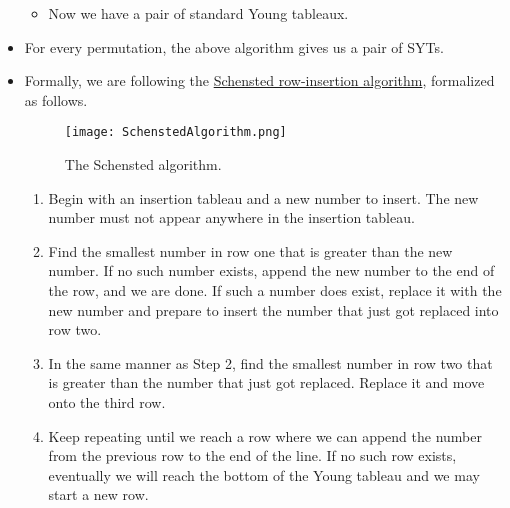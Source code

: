 \documentclass[../notes.tex]{subfiles}
\begin{document}
\begin{itemize}
\begin{itemize}
\begin{center}
        \end{center}
        \item Now we have a pair of standard Young tableaux.
    \end{itemize}
    \item For every permutation, the above algorithm gives us a pair of SYTs.
    \item Formally, we are following the \href{https://en.wikipedia.org/wiki/Robinson%E2%80%93Schensted_correspondence}{Schensted row-insertion algorithm}, formalized as follows.
    \begin{figure}[H]
        \centering
        \texttt{[image: SchenstedAlgorithm.png]}
        \caption{The Schensted algorithm.}
        \label{fig:SchenstedAlgorithm}
    \end{figure}
    \begin{enumerate}
        \item Begin with an insertion tableau and a new number to insert. The new number must not appear anywhere in the insertion tableau.
        \item Find the smallest number in row one that is greater than the new number. If no such number exists, append the new number to the end of the row, and we are done. If such a number does exist, replace it with the new number and prepare to insert the number that just got replaced into row two.
        \item In the same manner as Step 2, find the smallest number in row two that is greater than the number that just got replaced. Replace it and move onto the third row.
        \item Keep repeating until we reach a row where we can append the number from the previous row to the end of the line. If no such row exists, eventually we will reach the bottom of the Young tableau and we may start a new row.
    \end{enumerate}

\end{itemize}
\end{document}

